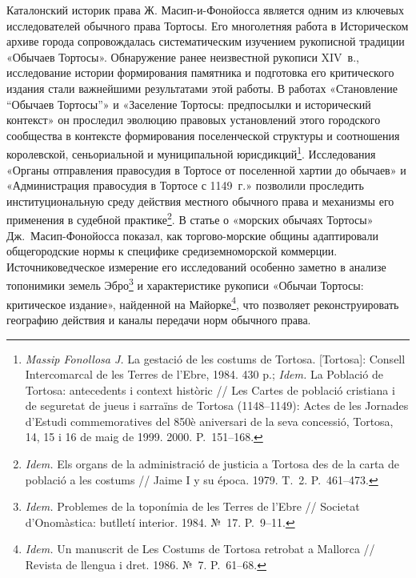 Каталонский историк права Ж. Масип-и-Фонойосса является одним из ключевых исследователей обычного права Тортосы. Его многолетняя работа в Историческом архиве города сопровождалась систематическим изучением рукописной традиции «Обычаев Тортосы». Обнаружение ранее неизвестной рукописи XIV~в., исследование истории формирования памятника и подготовка его критического издания стали важнейшими результатами этой работы. В работах «Становление “Обычаев Тортосы”» и «Заселение Тортосы: предпосылки и исторический контекст» он проследил эволюцию правовых установлений этого городского сообщества в контексте формирования поселенческой структуры и соотношения королевской, сеньориальной и муниципальной юрисдикций\footnote{\emph{ Massip Fonollosa J.} La gestació de les costums de Tortosa. [Tortosa]: Consell Intercomarcal de les Terres de l’Ebre, 1984. 430 p.; \emph{Idem.} La Població de Tortosa: antecedents i context històric // Les Cartes de població cristiana i de seguretat de jueus i sarraïns de Tortosa (1148--1149): Actes de les Jornades d'Estudi commemoratives del 850è aniversari de la seva concessió, Tortosa, 14, 15 i 16 de maig de 1999. 2000. P.~151--168.}. Исследования «Органы отправления правосудия в Тортосе от поселенной хартии до обычаев» и «Администрация правосудия в Тортосе с 1149~г.» позволили проследить институциональную среду действия местного обычного права и механизмы его применения в судебной практике\footnote{\emph{Idem.} Els organs de la administració de justicia a Tortosa des de la carta de població a les costums // Jaime I y su época. 1979. T.~2. P.~461--473.}. В статье о «морских обычаях Тортосы» Дж.~Масип-Фонойосса показал, как торгово-морские общины адаптировали общегородские нормы к специфике средиземноморской коммерции. Источниковедческое измерение его исследований особенно заметно в анализе топонимики земель Эбро\footnote{\emph{Idem. }Problemes de la toponímia de les Terres de l’Ebre // Societat d’Onomàstica: butlletí interior. 1984. №~17. P.~9--11.} и характеристике рукописи «Обычаи Тортосы: критическое издание», найденной на Майорке\footnote{\emph{Idem.} Un manuscrit de Les Costums de Tortosa retrobat a Mallorca // Revista de llengua i dret. 1986. №~7. P.~61--68.}, что позволяет реконструировать географию действия и каналы передачи норм обычного права.

